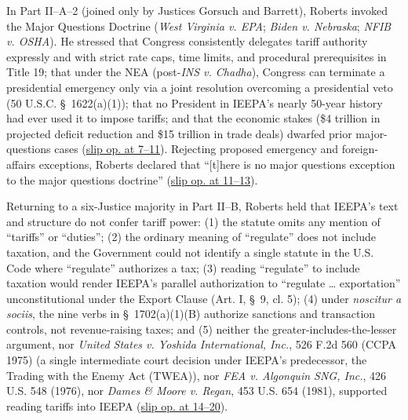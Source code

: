 \documentclass[12pt]{article}
\begin{document}
In Part II--A--2 (joined only by Justices Gorsuch and Barrett), Roberts invoked the Major Questions Doctrine (\textit{West Virginia v. EPA}; \textit{Biden v. Nebraska}; \textit{NFIB v. OSHA}). He stressed that Congress consistently delegates tariff authority expressly and with strict rate caps, time limits, and procedural prerequisites in Title 19; that under the NEA (post-\textit{INS v. Chadha}), Congress can terminate a presidential emergency only via a joint resolution overcoming a presidential veto (50 U.S.C. \S~1622(a)(1)); that no President in IEEPA's nearly 50-year history had ever used it to impose tariffs; and that the economic stakes (\$4 trillion in projected deficit reduction and \$15 trillion in trade deals) dwarfed prior major-questions cases (\href{https://www.law.cornell.edu/supremecourt/text/24-1287}{slip op. at 7--11}). Rejecting proposed emergency and foreign-affairs exceptions, Roberts declared that ``[t]here is no major questions exception to the major questions doctrine'' (\href{https://www.law.cornell.edu/supremecourt/text/24-1287}{slip op. at 11--13}).

Returning to a six-Justice majority in Part II--B, Roberts held that IEEPA's text and structure do not confer tariff power: (1) the statute omits any mention of ``tariffs'' or ``duties''; (2) the ordinary meaning of ``regulate'' does not include taxation, and the Government could not identify a single statute in the U.S. Code where ``regulate'' authorizes a tax; (3) reading ``regulate'' to include taxation would render IEEPA's parallel authorization to ``regulate \ldots{} exportation'' unconstitutional under the Export Clause (Art. I, \S~9, cl. 5); (4) under \textit{noscitur a sociis}, the nine verbs in \S~1702(a)(1)(B) authorize sanctions and transaction controls, not revenue-raising taxes; and (5) neither the greater-includes-the-lesser argument, nor \textit{United States v. Yoshida International, Inc.}, 526 F.2d 560 (CCPA 1975) (a single intermediate court decision under IEEPA's predecessor, the Trading with the Enemy Act (TWEA)), nor \textit{FEA v. Algonquin SNG, Inc.}, 426 U.S. 548 (1976), nor \textit{Dames \& Moore v. Regan}, 453 U.S. 654 (1981), supported reading tariffs into IEEPA (\href{https://www.law.cornell.edu/supremecourt/text/24-1287}{slip op. at 14--20}).
\end{document}
